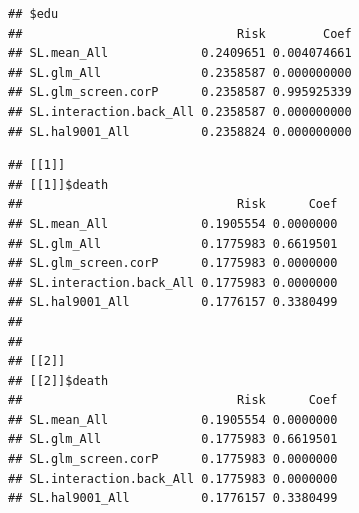 \documentclass[
]{book}
\newenvironment{Shaded}{\begin{snugshade}}{\end{snugshade}}
\newcommand{\CommentTok}[1]{\textcolor[rgb]{0.56,0.35,0.01}{\textit{#1}}}
\newcommand{\DecValTok}[1]{\textcolor[rgb]{0.00,0.00,0.81}{#1}}
\newcommand{\DocumentationTok}[1]{\textcolor[rgb]{0.56,0.35,0.01}{\textbf{\textit{#1}}}}
\newcommand{\NormalTok}[1]{#1}
\newcommand{\SpecialCharTok}[1]{\textcolor[rgb]{0.81,0.36,0.00}{\textbf{#1}}}
\begin{document}
\begin{Shaded}
\end{Shaded}

\begin{verbatim}
## $edu
##                              Risk        Coef
## SL.mean_All             0.2409651 0.004074661
## SL.glm_All              0.2358587 0.000000000
## SL.glm_screen.corP      0.2358587 0.995925339
## SL.interaction.back_All 0.2358587 0.000000000
## SL.hal9001_All          0.2358824 0.000000000
\end{verbatim}

\begin{Shaded}
\end{Shaded}

\begin{verbatim}
## [[1]]
## [[1]]$death
##                              Risk      Coef
## SL.mean_All             0.1905554 0.0000000
## SL.glm_All              0.1775983 0.6619501
## SL.glm_screen.corP      0.1775983 0.0000000
## SL.interaction.back_All 0.1775983 0.0000000
## SL.hal9001_All          0.1776157 0.3380499
## 
## 
## [[2]]
## [[2]]$death
##                              Risk      Coef
## SL.mean_All             0.1905554 0.0000000
## SL.glm_All              0.1775983 0.6619501
## SL.glm_screen.corP      0.1775983 0.0000000
## SL.interaction.back_All 0.1775983 0.0000000
## SL.hal9001_All          0.1776157 0.3380499
\end{verbatim}
\end{document}
